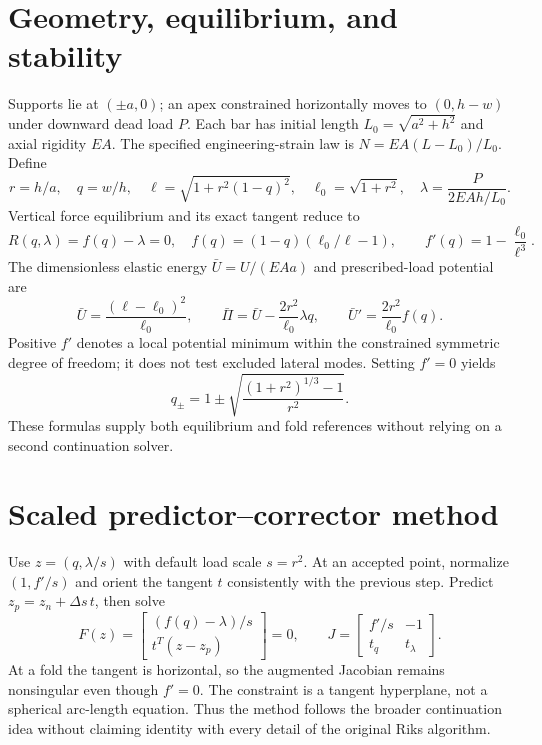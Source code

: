 \documentclass[10pt,a4paper]{article}
\begin{document}
\section{Geometry, equilibrium, and stability}
Supports lie at $(\pm a,0)$; an apex constrained horizontally moves to $(0,h-w)$ under downward dead load $P$. Each bar has initial length $L_0=\sqrt{a^2+h^2}$ and axial rigidity $EA$. The specified engineering-strain law is $N=EA(L-L_0)/L_0$. Define
\begin{equation}
r=h/a,\quad q=w/h,\quad \ell=\sqrt{1+r^2(1-q)^2},\quad
\ell_0=\sqrt{1+r^2},\quad\lambda=\frac{P}{2EAh/L_0}.
\end{equation}
Vertical force equilibrium and its exact tangent reduce to
\begin{equation}
R(q,\lambda)=f(q)-\lambda=0,\quad f(q)=(1-q)(\ell_0/\ell-1),
\qquad f'(q)=1-\frac{\ell_0}{\ell^3}.
\end{equation}
The dimensionless elastic energy $\bar U=U/(EAa)$ and prescribed-load potential are
\begin{equation}
\bar U=\frac{(\ell-\ell_0)^2}{\ell_0},\qquad
\bar\Pi=\bar U-\frac{2r^2}{\ell_0}\lambda q,\qquad
\bar U'=\frac{2r^2}{\ell_0}f(q).
\end{equation}
Positive $f'$ denotes a local potential minimum within the constrained symmetric degree of freedom; it does not test excluded lateral modes. Setting $f'=0$ yields
\begin{equation}
q_\pm=1\pm\sqrt{\frac{(1+r^2)^{1/3}-1}{r^2}}.
\end{equation}
These formulas supply both equilibrium and fold references without relying on a second continuation solver.
\newpage
\section{Scaled predictor--corrector method}
Use $z=(q,\lambda/s)$ with default load scale $s=r^2$. At an accepted point, normalize $(1,f'/s)$ and orient the tangent $t$ consistently with the previous step. Predict $z_p=z_n+\Delta s\,t$, then solve
\begin{equation}
F(z)=\begin{bmatrix}(f(q)-\lambda)/s\\t^T(z-z_p)\end{bmatrix}=0,
\qquad
J=\begin{bmatrix}f'/s&-1\\t_q&t_\lambda\end{bmatrix}.
\end{equation}
At a fold the tangent is horizontal, so the augmented Jacobian remains nonsingular even though $f'=0$. The constraint is a tangent hyperplane, not a spherical arc-length equation. Thus the method follows the broader continuation idea without claiming identity with every detail of the original Riks algorithm.
\end{document}
